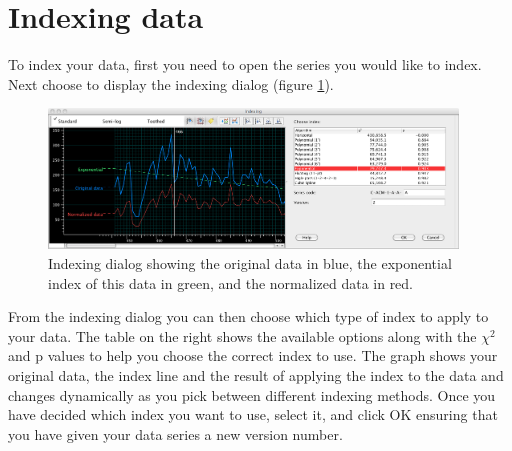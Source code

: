 \section{Indexing data}
To index your data, first you need to open the series you would like to index.  Next choose  to display the indexing dialog (figure \ref{fig:index}).

\begin{figure}[hbtp]
  \centering
    \includegraphics[width=0.97\textwidth]{Images/index.png}
    \caption{Indexing dialog showing the original data in blue, the exponential index of this data in green, and the normalized data in red. }
    \label{fig:index}
\end{figure}

From the indexing dialog you can then choose which type of index to apply to your data.  The table on the right shows the available options along with the $\chi^2$ and p values to help you choose the correct index to use. The graph shows your original data, the index line and the result of applying the index to the data and changes dynamically as you pick between different indexing methods. Once you have decided which index you want to use, select it, and click OK ensuring that you have given your data series a new version number.

